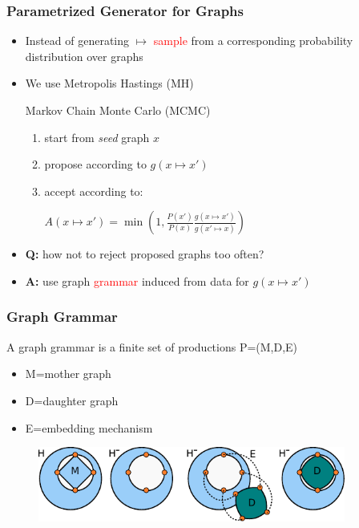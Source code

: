 \documentclass{beamer}
\newcommand{\red}[1]{\textcolor{red}{#1}}
\begin{document}
\begin{frame}
    \frametitle{Parametrized Generator for Graphs}
    \begin{itemize}
        \item Instead of generating $\mapsto$ \red{sample} from a corresponding probability distribution over graphs
        \item We use Metropolis Hastings (MH) \begin{tiny}Markov Chain Monte Carlo (MCMC)\end{tiny}
        \begin{enumerate}
            \item start from {\em seed} graph $x$
            \item propose according to $g(x \mapsto x')$
            \item accept according to: \\
            \begin{center}
            $A(x \mapsto x')=\min(1, \frac{P(x')}{P(x)} \frac{g(x \mapsto x')}{g(x' \mapsto x)})$
            \end{center}
        \end{enumerate}
        \item {\bf Q:} how not to reject proposed graphs too often?
        \item {\bf A:} use graph \red{grammar} induced from data  for $g(x \mapsto x')$
    \end{itemize}
\end{frame}

\begin{frame}
    \frametitle{Graph Grammar}
    A graph grammar is a finite set of productions P=(M,D,E) 
    \begin{itemize}
        \item M=mother graph
        \item D=daughter graph
        \item E=embedding mechanism
    \end{itemize}
    \begin{figure}[ht]
        \centering
        \includegraphics[width=0.9\textwidth]{images/grammar.pdf}
    \end{figure}
\end{frame}
\end{document}
